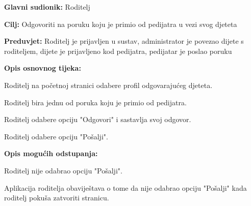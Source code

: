 						\noindent {}
					\begin{packed_item}
						
						\item \textbf{Glavni sudionik: }Roditelj
						\item  \textbf{Cilj:} Odgovoriti na poruku koju je primio od pedijatra u vezi svog djeteta
						\item  \textbf{Preduvjet:} Roditelj je prijavljen u sustav, administrator je povezao dijete s roditeljem, dijete je prijavljeno kod pedijatra, pedijatar je poslao poruku
						\item  \textbf{Opis osnovnog tijeka:}
						
						\item[] \begin{packed_enum}
							
							\item Roditelj na početnoj stranici odabere profil odgovarajućeg djeteta.
							\item Roditelj bira jednu od poruka koju je primio od pedijatra.
							\item Roditelj odabere opciju "Odgovori" i sastavlja svoj odgovor.
							\item Roditelj odabere opciju "Pošalji".
						\end{packed_enum}
						
						\item  \textbf{Opis mogućih odstupanja:}
						
						\item[] \begin{packed_item}
							
							\item[4.a] Roditelj nije odabrao opciju "Pošalji".
							\item[] \begin{packed_enum}
								
								\item Aplikacija roditelja obaviještava o tome da nije odabrao opciju "Pošalji" kada roditelj pokuša zatvoriti stranicu.
							\end{packed_enum}
							
							
						\end{packed_item}
						
						
					\end{packed_item}
					
